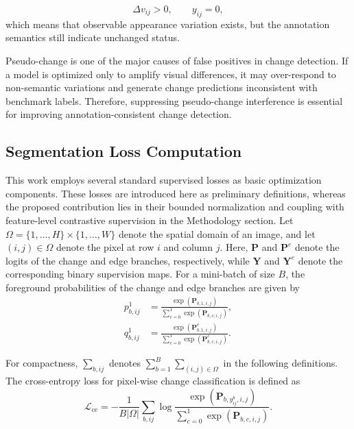         \begin{equation}
            \Delta v_{ij} > 0, \qquad y_{ij} = 0,
        \end{equation}
        which means that observable appearance variation exists, but the annotation semantics still indicate unchanged status.

        Pseudo-change is one of the major causes of false positives in change detection. If a model is optimized only to amplify visual differences, it may over-respond to non-semantic variations and generate change predictions inconsistent with benchmark labels. Therefore, suppressing pseudo-change interference is essential for improving annotation-consistent change detection.

    \subsection{Segmentation Loss Computation}\label{sec:Preliminary:SegmentationLossComputation}
        This work employs several standard supervised losses as basic optimization components. These losses are introduced here as preliminary definitions, whereas the proposed contribution lies in their bounded normalization and coupling with feature-level contrastive supervision in the Methodology section. Let $\Omega=\{1,\ldots,H\}\times\{1,\ldots,W\}$ denote the spatial domain of an image, and let $(i,j)\in\Omega$ denote the pixel at row $i$ and column $j$. Here, $\mathbf{P}$ and $\mathbf{P}^{e}$ denote the logits of the change and edge branches, respectively, while $\mathbf{Y}$ and $\mathbf{Y}^{e}$ denote the corresponding binary supervision maps. For a mini-batch of size $B$, the foreground probabilities of the change and edge branches are given by
        \begin{equation}
            \begin{aligned}
            p^{1}_{b,ij}
            &=
            \frac{\exp\left(\mathbf{P}_{b,1,i,j}\right)}
            {\sum_{c=0}^{1}\exp\left(\mathbf{P}_{b,c,i,j}\right)}, \\
            q^{1}_{b,ij}
            &=
            \frac{\exp\left(\mathbf{P}^{e}_{b,1,i,j}\right)}
            {\sum_{c=0}^{1}\exp\left(\mathbf{P}^{e}_{b,c,i,j}\right)}.
            \end{aligned}
            \label{eq:foreground_probability}
        \end{equation}

        For compactness, $\sum_{b,ij}$ denotes $\sum_{b=1}^{B}\sum_{(i,j)\in\Omega}$ in the following definitions. The cross-entropy loss for pixel-wise change classification is defined as
        \begin{equation}
            \mathcal{L}_{\text{ce}}
            =
            -\frac{1}{B|\Omega|}
            \sum_{b,ij}
            \log
            \frac{\exp\left(\mathbf{P}_{b,y^{b}_{ij},i,j}\right)}
            {\sum_{c=0}^{1}\exp\left(\mathbf{P}_{b,c,i,j}\right)}.
            \label{eq:ce_loss}
        \end{equation}

